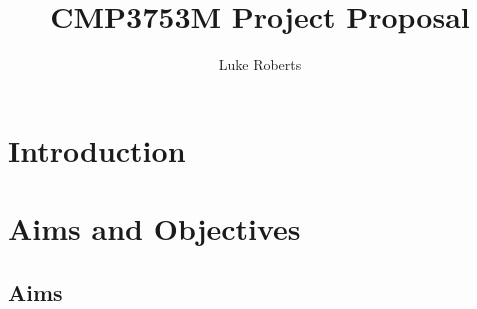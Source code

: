 \documentclass[runningheads]{llncs}
\begin{document}
\title{CMP3753M Project Proposal}

\author{Luke Roberts}


\maketitle

\section{Introduction}
%
%




\section{Aims and Objectives}

\subsection{Aims}
\end{document}
